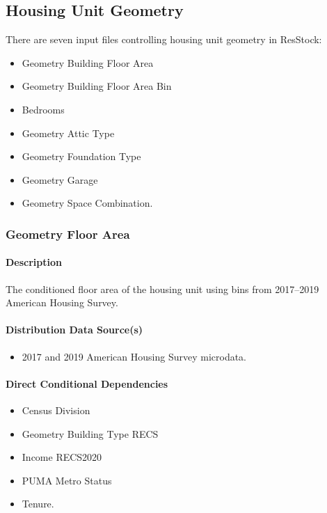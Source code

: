 \subsection{Housing Unit Geometry}

There are seven input files controlling housing unit geometry in ResStock:

\begin{itemize}
    \item Geometry Building Floor Area
    \item Geometry Building Floor Area Bin
    \item Bedrooms
    \item Geometry Attic Type
    \item Geometry Foundation Type
    \item Geometry Garage
    \item Geometry Space Combination.
\end{itemize}



\subsubsection{Geometry Floor Area}
\paragraph{Description}
The conditioned floor area of the housing unit using bins from 2017--2019 American Housing Survey.

\paragraph{Distribution Data Source(s)}
\begin{itemize}
    \item 2017 and 2019 American Housing Survey microdata.
\end{itemize}

\paragraph{Direct Conditional Dependencies}
\begin{itemize}
    \item Census Division
    \item Geometry Building Type RECS
    \item Income RECS2020
    \item PUMA Metro Status
    \item Tenure.
\end{itemize}

